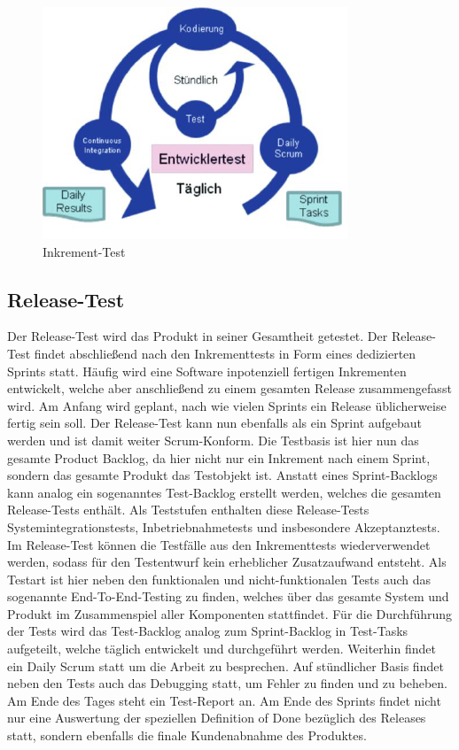 \begin{figure}[!htb]
  \centering
  \includegraphics[width=.9\textwidth]{figures/rebecca/Inkrement_Test.png}
  \caption[]{Inkrement-Test}
  \label{fig:InkrementTest}
\end{figure}

\subsection{Release-Test}
\label{sub:release_test}

Der Release-Test wird das Produkt in seiner Gesamtheit getestet. Der Release-Test findet abschließend nach den Inkrementtests in Form eines dedizierten Sprints statt. Häufig wird eine Software inpotenziell fertigen Inkrementen entwickelt, welche aber anschließend zu einem gesamten Release zusammengefasst wird. Am Anfang wird geplant, nach wie vielen Sprints ein Release üblicherweise fertig sein soll. Der Release-Test kann nun ebenfalls als ein Sprint aufgebaut werden und ist damit weiter Scrum-Konform. Die Testbasis ist hier nun das gesamte Product Backlog, da hier nicht nur ein Inkrement nach einem Sprint, sondern das gesamte Produkt das Testobjekt ist. Anstatt eines Sprint-Backlogs kann analog ein sogenanntes Test-Backlog erstellt werden, welches die gesamten Release-Tests enthält. Als Teststufen enthalten diese Release-Tests Systemintegrationstests, Inbetriebnahmetests und insbesondere Akzeptanztests. Im Release-Test können die Testfälle aus den Inkrementtests wiederverwendet werden, sodass für den Testentwurf kein erheblicher Zusatzaufwand entsteht. Als Testart ist hier neben den funktionalen und nicht-funktionalen Tests auch das sogenannte End-To-End-Testing zu finden, welches über das gesamte System und Produkt im Zusammenspiel aller Komponenten stattfindet. Für die Durchführung der Tests wird das Test-Backlog analog zum Sprint-Backlog in Test-Tasks aufgeteilt, welche täglich entwickelt und durchgeführt werden. Weiterhin findet ein Daily Scrum statt um die Arbeit zu besprechen. Auf stündlicher Basis findet neben den Tests auch das Debugging statt, um Fehler zu finden und zu beheben. Am Ende des Tages steht ein Test-Report an. Am Ende des Sprints findet nicht nur eine Auswertung der speziellen Definition of Done bezüglich des Releases statt, sondern ebenfalls die finale Kundenabnahme des Produktes.

